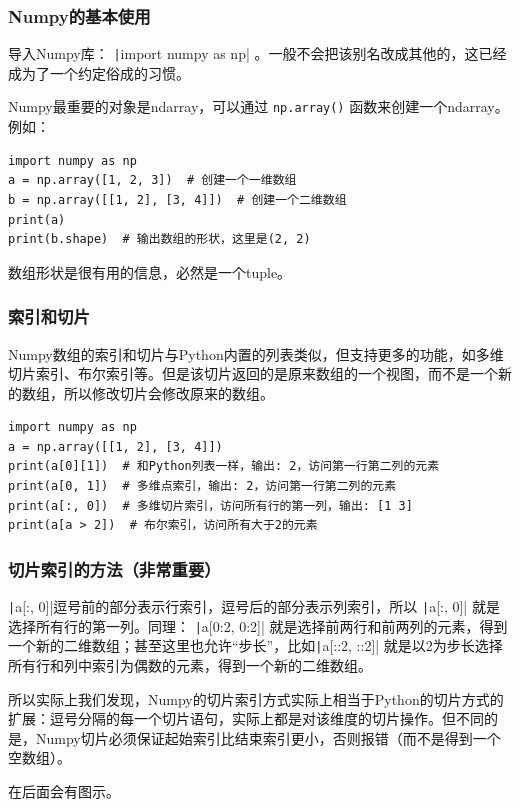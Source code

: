 \begin{frame}[fragile]
    \frametitle{Numpy的基本使用}

    导入Numpy库： \texttt|import numpy as np| 。一般不会把该别名改成其他的，这已经成为了一个约定俗成的习惯。

    Numpy最重要的对象是ndarray，可以通过 \texttt{np.array()} 函数来创建一个ndarray。例如：
    \begin{verbatim}
import numpy as np
a = np.array([1, 2, 3])  # 创建一个一维数组
b = np.array([[1, 2], [3, 4]])  # 创建一个二维数组
print(a)
print(b.shape)  # 输出数组的形状，这里是(2, 2)
    \end{verbatim}
    数组形状是很有用的信息，必然是一个tuple。

\end{frame}

\begin{frame}[fragile]
    \frametitle{索引和切片}

    Numpy数组的索引和切片与Python内置的列表类似，但支持更多的功能，如多维切片索引、布尔索引等。但是该切片返回的是原来数组的一个视图，而不是一个新的数组，所以修改切片会修改原来的数组。
    \begin{verbatim}
import numpy as np
a = np.array([[1, 2], [3, 4]])
print(a[0][1])  # 和Python列表一样，输出: 2，访问第一行第二列的元素
print(a[0, 1])  # 多维点索引，输出: 2，访问第一行第二列的元素
print(a[:, 0])  # 多维切片索引，访问所有行的第一列，输出: [1 3]
print(a[a > 2])  # 布尔索引，访问所有大于2的元素
    \end{verbatim}

\end{frame}

\begin{frame}
    \frametitle{切片索引的方法（非常重要）}

    \texttt|a[:, 0]|逗号前的部分表示行索引，逗号后的部分表示列索引，所以 \texttt|a[:, 0]| 就是选择所有行的第一列。同理： \texttt|a[0:2, 0:2]| 就是选择前两行和前两列的元素，得到一个新的二维数组；甚至这里也允许“步长”，比如\texttt|a[::2, ::2]| 就是以2为步长选择所有行和列中索引为偶数的元素，得到一个新的二维数组。

    所以实际上我们发现，Numpy的切片索引方式实际上相当于Python的切片方式的扩展：逗号分隔的每一个切片语句，实际上都是对该维度的切片操作。但不同的是，Numpy切片必须保证起始索引比结束索引更小，否则报错（而不是得到一个空数组）。

    在后面会有图示。
\end{frame}

